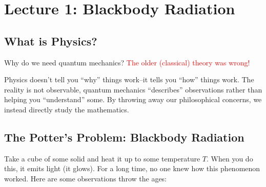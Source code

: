 \section{Lecture 1: Blackbody Radiation}

\subsection{What is Physics?}

Why do we need quantum mechanics? \textcolor{red}{The older (classical) theory was wrong!}

Physics doesn't tell you ``why'' things work--it tells you ``how'' things work. The reality is not observable, quantum mechanics ``describes'' observations
rather than helping you ``understand'' some. By throwing away our philosophical concerns, we instead directly study the mathematics.

\subsection{The Potter's Problem: Blackbody Radiation}

Take a cube of some solid and heat it up to some temperature $T$. When you do this, it emits light (it glows). For a long time,
no one knew how this phenomenon worked. Here are some observations throw the ages:

